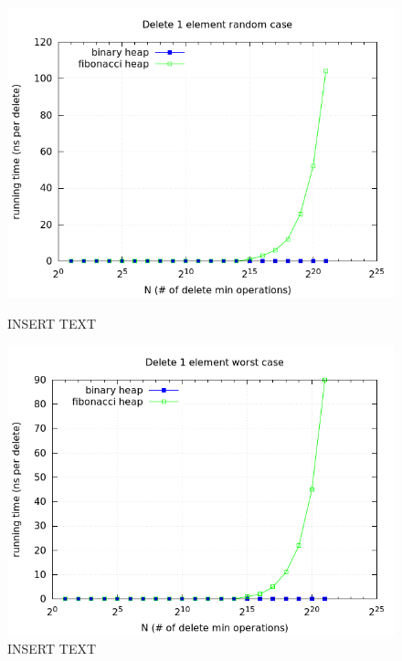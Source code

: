 \documentclass[a4paper,oneside,article,11pt]{memoir}
\begin{document}
\begin{figure}[H]
\centering
\begin{minipage}{0.48\columnwidth}
  \centering
  \includegraphics[width=\linewidth]{../res/delmin/delmin_del_1_time_random.png}%
  \caption{INSERT TEXT}
  \label{fig:delmin_1_random_time}
\end{minipage}%
\hfill
\begin{minipage}{0.48\columnwidth}
  \centering
  \includegraphics[width=\linewidth]{../res/delmin/delmin_del_1_time_worst.png}%
  \caption{INSERT TEXT}
  \label{fig:delmin_1_worst_time}
\end{minipage}
\end{figure}
\end{document}
